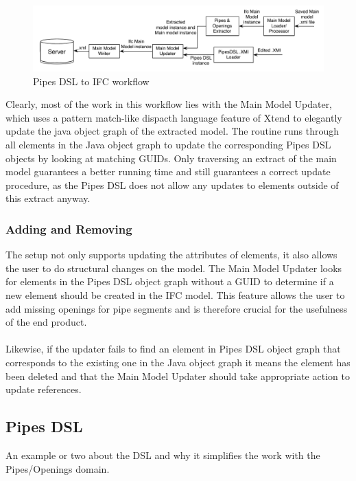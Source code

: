 \begin{figure}[htbp]
    \centering
        \includegraphics[width=120mm]{images/Pipes2IFC.pdf}
    \caption{Pipes DSL to IFC workflow}
    \label{fig:Pipes2IFCWorkflow}
\end{figure}

Clearly, most of the work in this workflow lies with the Main Model Updater, which uses a pattern match-like dispacth language feature of Xtend to elegantly update the java object graph of the extracted model. The routine runs through all elements in the Java object graph to update the corresponding Pipes DSL objects by looking at matching GUIDs. Only traversing an extract of the main model guarantees a better running time and still guarantees a correct update procedure, as the Pipes DSL does not allow any updates to elements outside of this extract anyway.
\subsubsection{Adding and Removing}
The setup not only supports updating the attributes of elements, it also allows the user to do structural changes on the model. The Main Model Updater looks for elements in the Pipes DSL object graph without a GUID to determine if a new element should be created in the IFC model. This feature allows the user to add missing openings for pipe segments and is therefore crucial for the usefulness of the end product. 
\paragraph{}
Likewise, if the updater fails to find an element in Pipes DSL object graph that corresponds to the existing one in the Java object graph it means the element has been deleted and that the Main Model Updater should take appropriate action to update references.

\subsection{Pipes DSL}
An example or two about the DSL and why it simplifies the work with the Pipes/Openings domain.













